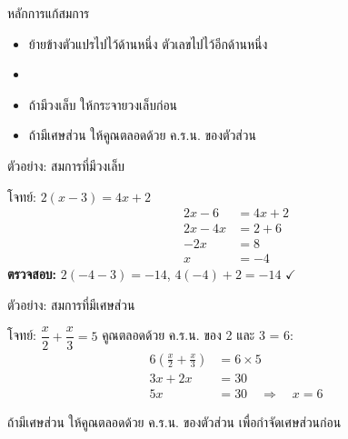 \documentclass[11pt, aspectratio=169]{beamer}
\begin{document}
\begin{frame}{หลักการแก้สมการ}
  \begin{intuition}[หลักการสำคัญ]
    \begin{itemize}
      \item ย้ายข้างตัวแปรไปไว้ด้านหนึ่ง ตัวเลขไปไว้อีกด้านหนึ่ง
      \item {}
      \item ถ้ามีวงเล็บ ให้กระจายวงเล็บก่อน
      \item ถ้ามีเศษส่วน ให้คูณตลอดด้วย ค.ร.น. ของตัวส่วน
    \end{itemize}
  \end{intuition}
\end{frame}

\begin{frame}{ตัวอย่าง: สมการที่มีวงเล็บ}
  \begin{exambox}
    โจทย์: $2(x - 3) = 4x + 2$
    \begin{align*}
      2x - 6 &= 4x + 2 \\
      2x - 4x &= 2 + 6 \\
      -2x &= 8 \\
      x &= -4
    \end{align*}
    \textbf{ตรวจสอบ:} $2(-4-3) = -14$, \; $4(-4)+2 = -14$ \quad $\checkmark$
  \end{exambox}
\end{frame}

\begin{frame}{ตัวอย่าง: สมการที่มีเศษส่วน}
  \begin{exambox}
    โจทย์: $\dfrac{x}{2} + \dfrac{x}{3} = 5$ \newline
    คูณตลอดด้วย ค.ร.น. ของ 2 และ 3 = 6:
    \begin{align*}
      6\left(\frac{x}{2} + \frac{x}{3}\right) &= 6 \times 5 \\
      3x + 2x &= 30 \\
      5x &= 30 \quad \Rightarrow \quad x = 6
    \end{align*}
  \end{exambox}

  \begin{intuition}[เทคนิค]
    ถ้ามีเศษส่วน ให้คูณตลอดด้วย ค.ร.น. ของตัวส่วน เพื่อกำจัดเศษส่วนก่อน
  \end{intuition}
\end{frame}

\end{document}
